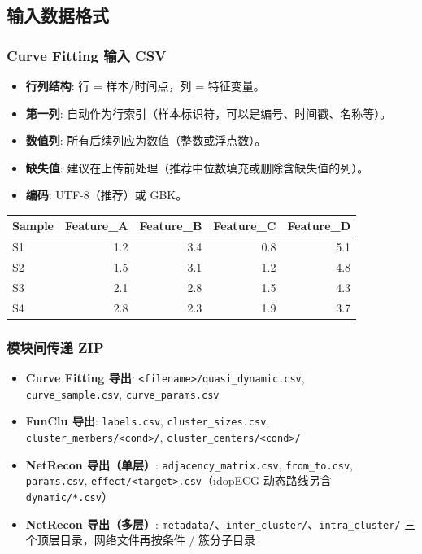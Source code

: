 \documentclass[12pt,a4paper]{ctexart}
\newcommand{\file}[1]{\texttt{#1}}
\begin{document}
\subsection{输入数据格式}

\subsubsection{Curve Fitting 输入 CSV}

\begin{itemize}[leftmargin=*]
    \item \textbf{行列结构}: 行 = 样本/时间点，列 = 特征变量。
    \item \textbf{第一列}: 自动作为行索引（样本标识符，可以是编号、时间戳、名称等）。
    \item \textbf{数值列}: 所有后续列应为数值（整数或浮点数）。
    \item \textbf{缺失值}: 建议在上传前处理（推荐中位数填充或删除含缺失值的列）。
    \item \textbf{编码}: UTF-8（推荐）或 GBK。
\end{itemize}

\begin{center}
\small
\begin{tabular}{@{}lrrrr@{}}
\toprule
\textbf{Sample} & \textbf{Feature\_A} & \textbf{Feature\_B} & \textbf{Feature\_C} & \textbf{Feature\_D} \\
\midrule
S1 & 1.2 & 3.4 & 0.8 & 5.1 \\
S2 & 1.5 & 3.1 & 1.2 & 4.8 \\
S3 & 2.1 & 2.8 & 1.5 & 4.3 \\
S4 & 2.8 & 2.3 & 1.9 & 3.7 \\
\bottomrule
\end{tabular}
\end{center}

\subsubsection{模块间传递 ZIP}

\begin{itemize}[leftmargin=*]
    \item \textbf{Curve Fitting 导出}: \file{<filename>/quasi\_dynamic.csv}, \\
    \file{curve\_sample.csv}, \file{curve\_params.csv}
    \item \textbf{FunClu 导出}: \file{labels.csv}, \file{cluster\_sizes.csv}, \\
    \file{cluster\_members/<cond>/}, \file{cluster\_centers/<cond>/}
    \item \textbf{NetRecon 导出（单层）}: \file{adjacency\_matrix.csv}, \file{from\_to.csv}, \file{params.csv}, \file{effect/<target>.csv}（idopECG 动态路线另含 \file{dynamic/*.csv}）
    \item \textbf{NetRecon 导出（多层）}: \file{metadata/}、\file{inter\_cluster/}、\file{intra\_cluster/} 三个顶层目录，网络文件再按条件 / 簇分子目录
\end{itemize}
\end{document}

